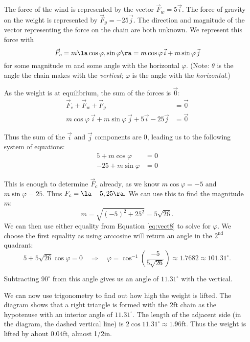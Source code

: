 {The force of the wind is represented by the vector $\vec F_w = 5\vec i$. The force of gravity on the weight is represented by $\vec F_g = -25\vec j$. The direction and magnitude of the vector representing the force on the chain are both unknown. We represent this force with $$\vec F_c = m\la \cos\varphi,\sin\varphi\ra = m\cos\varphi\, \vec i + m\sin\varphi\,\vec j$$ for some magnitude $m$ and some angle with the horizontal $\varphi$. (Note: $\theta$ is the angle the chain makes with the \emph{vertical}; $\varphi$ is the angle with the \emph{horizontal}.)

As the weight is at equilibrium, the sum of the forces is $\vec0$:
\begin{align*}
\vec F_c + \vec F_w + \vec F_g &= \vec 0\\
m\cos\varphi\, \vec i + m\sin\varphi\,\vec j + 5\vec i - 25\vec j &=\vec 0
\end{align*}

 Thus the sum of the $\vec i$ and $\vec j$ components are 0, leading us to the following system of equations:
\begin{equation}
\begin{split}
5+m\cos\varphi &= 0\\
-25+m\sin\varphi &= 0
\end{split}\label{eq:vect8}
\end{equation}

This is enough to determine $\vec F_c$ already, as we know $m\cos \varphi = -5$ and $m\sin\varphi =25$. Thus $F_c = \la -5,25\ra.$ We can use this to find the magnitude $m$:
$$m = \sqrt{(-5)^2+25^2} = 5\sqrt{26}.$$
We can then use either equality from Equation \eqref{eq:vect8} to solve for $\varphi$. We choose the first equality as using arccosine will return an angle in the $2^\text{nd}$ quadrant:
$$5 + 5\sqrt{26}\cos \varphi = 0 \quad \Rightarrow \quad \varphi = \cos^{-1}\left(\frac{-5}{5\sqrt{26}}\right) \approx 1.7682\approx 101.31^\circ.$$

Subtracting $90^\circ$ from this angle gives us an angle of $11.31^\circ$ with the vertical.

We can now use trigonometry to find out how high the weight is lifted. The diagram shows that a right triangle is formed with the 2ft chain as the hypotenuse with an interior angle of $11.31^\circ$. The length of the adjacent side (in the diagram, the dashed vertical line) is $2\cos 11.31^\circ \approx 1.96$ft. Thus the weight is lifted by about $0.04$ft, almost 1/2in.
}\\


